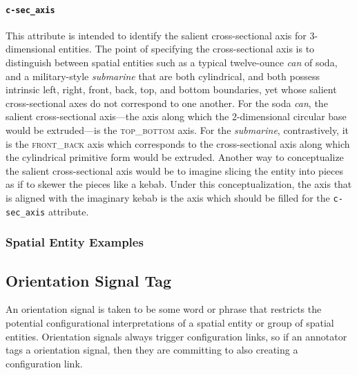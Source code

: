 \documentclass[11pt]{article}
\begin{document}
\paragraph{\texttt{c-sec\_axis}} %
\label{par:c_sec_axis}
This attribute is intended to identify the salient cross-sectional axis for 3-dimensional entities. The point of specifying the cross-sectional axis is to distinguish between spatial entities such as a typical twelve-ounce \emph{can} of soda, and a military-style \emph{submarine} that are both cylindrical, and both possess intrinsic left, right, front, back, top, and bottom boundaries, yet whose salient cross-sectional axes do not correspond to one another. For the soda \emph{can}, the salient cross-sectional axis---the axis along which the 2-dimensional circular base would be extruded---is the \textsc{top\_bottom} axis. For the \emph{submarine}, contrastively, it is the \textsc{front\_back} axis which corresponds to the cross-sectional axis along which the cylindrical primitive form would be extruded. Another way to conceptualize the salient cross-sectional axis would be to imagine slicing the entity into pieces as if to skewer the pieces like a kebab. Under this conceptualization, the axis that is aligned with the imaginary kebab is the axis which should be filled for the \texttt{c-sec\_axis} attribute.


\subsubsection{Spatial Entity Examples} %
\label{ssub:spatial_entity_examples}

\eenumsentence{
    \item %
}\label{ex:spatial_entity}



\subsection{Orientation Signal Tag} %
\label{sub:orientation_signal_tag}

An orientation signal is taken to be some word or phrase that restricts the potential configurational interpretations of a spatial entity or group of spatial entities. Orientation signals always trigger configuration links, so if an annotator tags a orientation signal, then they are committing to also creating a configuration link. 
\end{document}
